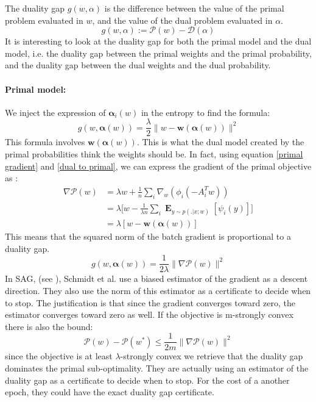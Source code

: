\documentclass{article}
\DeclareMathOperator{\1}{\mathbb{1}}
\DeclareMathOperator{\E}{\mathbf{E}}
\begin{document}
The duality gap $g(w,\alpha)$ is the difference between the value  of the primal problem evaluated in $w$, and the value of the dual problem evaluated in $\alpha$.
\begin{equation*}
	g(w,\alpha) := \mathscr P(w) - \mathscr D(\alpha)
\end{equation*}
It is interesting to look at the duality gap for both the primal model and the dual model, i.e. the duality gap between the primal weights and the primal probability, and the duality gap between the dual weights and the dual probability.

\paragraph{Primal model:}
We inject the expression of $\bm \alpha_i(w)$ in the entropy to find the formula:
\begin{equation}
	\label{primal duality gap}
	g(w,\bm \alpha(w)) = \frac{\lambda}{2} \|w- \bm w(\bm \alpha(w))\|^2
\end{equation}
This formula involves $\bm w(\bm \alpha(w))$.
This is what the dual model created by the primal probabilities think the weights should be. 
In fact, using equation \ref{primal gradient} and \ref{dual to primal}, we can express the gradient of the primal objective 	as :
\begin{align*}
	\nabla \mathscr P(w) 
	& = \lambda w + \frac{1}{n} \sum_i \nabla_w(\phi_i(-A_i^Tw)) \\
	& = \lambda \bigg [ w - \frac{1}{\lambda n} \sum_i \E_{y \sim p(. | x ; w)} [\psi_i(y)] \bigg ] \\
	& = \lambda [ w - \bm w(\bm \alpha(w))]
\end{align*}
This means that the squared norm of the batch gradient is proportional to a duality gap.
\begin{equation}
	g(w,\bm \alpha(w)) = \frac{1}{2 \lambda} \|\nabla \mathscr P(w)\|^2
\end{equation}
In SAG, (see \cite{schmidt_non-uniform_2015}), Schmidt et al. use a biased estimator of the gradient as a descent direction.
They also use the norm of this estimator as a certificate to decide when to stop.
The justification is that since the gradient converges toward zero, the estimator converges toward zero as well.
If the objective is m-strongly convex there is also the bound:
\begin{equation*}
	\mathscr P (w) - \mathscr P(w^*) \leq \frac{1}{2 m}\|\nabla \mathscr P (w)\|^2
\end{equation*}
since the objective is at least $\lambda$-strongly convex we retrieve that the duality gap dominates the primal sub-optimality.
They are actually using an estimator of the duality gap as a certificate to decide when to stop.
For the cost of a another epoch, they could have the exact duality gap certificate.
\end{document}
